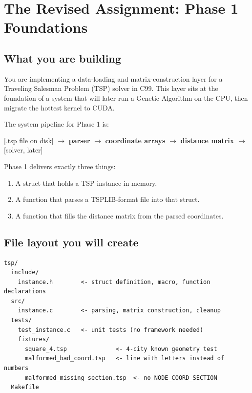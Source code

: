 \documentclass[11pt]{article}
\begin{document}
\newpage

\section{The Revised Assignment: Phase 1 Foundations}

\subsection{What you are building}

You are implementing a data-loading and matrix-construction layer for a Traveling Salesman Problem (TSP) solver in C99. This layer sits at the foundation of a system that will later run a Genetic Algorithm on the CPU, then migrate the hottest kernel to CUDA.

The system pipeline for Phase 1 is:

\begin{center}
\ttfamily
\small
[.tsp file on disk] $\longrightarrow$ \textbf{parser} $\longrightarrow$ \textbf{coordinate arrays} $\longrightarrow$ \textbf{distance matrix} $\longrightarrow$ [solver, later]
\end{center}

\medskip

Phase 1 delivers exactly three things:
\begin{enumerate}[label=\arabic*.]
  \item A struct that holds a TSP instance in memory.
  \item A function that parses a TSPLIB-format file into that struct.
  \item A function that fills the distance matrix from the parsed coordinates.
\end{enumerate}

\subsection{File layout you will create}

\begin{lstlisting}[style=cstyle, language={}]
tsp/
  include/
    instance.h        <- struct definition, macro, function declarations
  src/
    instance.c        <- parsing, matrix construction, cleanup
  tests/
    test_instance.c   <- unit tests (no framework needed)
    fixtures/
      square_4.tsp              <- 4-city known geometry test
      malformed_bad_coord.tsp   <- line with letters instead of numbers
      malformed_missing_section.tsp  <- no NODE_COORD_SECTION
  Makefile
\end{lstlisting}
\end{document}

